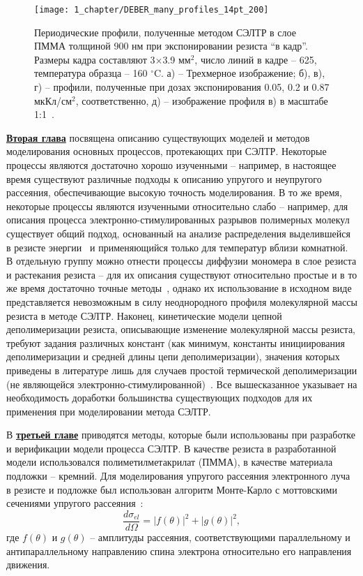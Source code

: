 \begin{figure}
	\centering
	\texttt{[image: 1\_chapter/DEBER\_many\_profiles\_14pt\_200]}
	\caption{Периодические профили, полученные методом СЭЛТР в слое ПММА толщиной 900 нм при экспонировании резиста ``в кадр''. Размеры кадра составляют 3$\times$3.9 мм$^{\text{2}}$, число линий в кадре -- 625, температура образца -- 160 $^\circ$C. а) --  Трехмерное изображение; б), в), г) -- профили, полученные при дозах экспонирования 0.05, 0.2 и 0.87 мкКл/см$^{\text{2}}$, соответственно, д) -- изображение профиля в) в масштабе 1:1~\cite{Bruk_2016_mee}.}
	\label{fig:DEBER_many_profiles}
\end{figure}

\underline{\textbf{Вторая глава}} посвящена описанию существующих моделей и методов моделирования основных процессов, протекающих при СЭЛТР. Некоторые процессы являются достаточно хорошо изученными -- например, в настоящее время существуют различные подходы к описанию упругого и неупругого рассеяния, обеспечивающие высокую точность моделирования. В то же время, некоторые процессы являются изученными относительно слабо -- например, для описания процесса электронно-стимулированных разрывов полимерных молекул существует общий подход, основанный на анализе распределения выделившейся в резисте энергии~\cite{Greeneich1979_Mf_Mn} и применяющийся только для температур вблизи комнатной. В отдельную группу можно отнести процессы диффузии мономера в слое резиста и растекания резиста -- для их описания существуют относительно простые и в то же время достаточно точные методы~\cite{Fragala_3_diffusion, Leveder_2010, Kirchner_reflow}, однако их использование в исходном виде представляется невозможным в силу неоднородного профиля молекулярной массы резиста в методе СЭЛТР. Наконец, кинетические модели цепной деполимеризации резиста, описывающие изменение молекулярной массы резиста, требуют задания различных констант (как минимум, константы инициирования деполимеризации и средней длины цепи деполимеризации), значения которых приведены в литературе лишь для случаев простой термической деполимеризации (не являющейся электронно-стимулированной)~\cite{Boyd_3, Mita_PMMA_zip_lengths_T}. Все вышесказанное указывает на необходимость доработки большинства существующих подходов для их применения при моделировании метода СЭЛТР.

В \underline{\textbf{третьей главе}} приводятся методы, которые были использованы при разработке и верификации модели процесса СЭЛТР. В качестве резиста в разработанной модели использовался полиметилметакрилат (ПММА), в качестве материала подложки -- кремний. Для моделирования упругого рассеяния электронного луча в резисте и подложке был использован алгоритм Монте-Карло с моттовскими сечениями упругого рассеяния~\cite{Ciappa_2010}:
\begin{equation}
	\frac{d \sigma_{el}}{d \Omega}=|f(\theta)|^2+|g(\theta)|^2,
\end{equation}
где $f(\theta)$ и $g(\theta)$ -- амплитуды рассеяния, соответствующими параллельному и антипараллельному направлению спина электрона относительно его направления движения.

